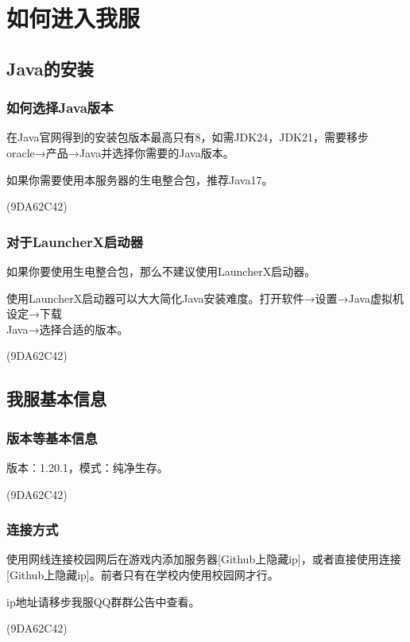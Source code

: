 \documentclass[UTF8,a4paper]{article}
\begin{document}
	\section{如何进入我服}
		\hypertarget{howtologinin}{}
		\subsection{Java的安装}
			\subsubsection{如何选择Java版本}
				\par 在Java官网得到的安装包版本最高只有8，如需JDK24，JDK21，需要移步oracle→产品→Java并选择你需要的Java版本。
				\par 如果你需要使用本服务器的生电整合包，推荐Java17。
				\begin{flushright}(9DA62C42)\end{flushright}
			\subsubsection{对于LauncherX启动器}
				\par 如果你要使用生电整合包，那么不建议使用LauncherX启动器。
				\par 使用LauncherX启动器可以大大简化Java安装难度。打开软件→设置→Java虚拟机设定→下载 \\ Java→选择合适的版本。
				\begin{flushright}(9DA62C42)\end{flushright}
		\subsection{我服基本信息}
			\subsubsection{版本等基本信息}
				\par 版本：1.20.1，模式：纯净生存。
				\begin{flushright}(9DA62C42)\end{flushright}
			\subsubsection{连接方式}
				\par 使用网线连接校园网后在游戏内添加服务器[Github上隐藏ip]，或者直接使用连接[Github上隐藏ip]。前者只有在学校内使用校园网才行。
				\par ip地址请移步我服QQ群群公告中查看。
				\begin{flushright}(9DA62C42)\end{flushright}
\end{document}
